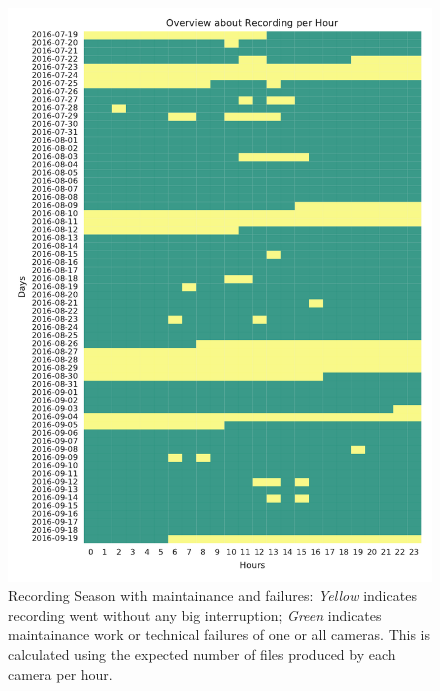 \begin{figure}[htb]
	\centering
	\includegraphics[width=1.0\textwidth]{Figures/recording}
	\caption[Recording Season with maintainance and failures]{Recording Season with maintainance and failures: \emph{Yellow} indicates recording went without any big interruption; \emph{Green} indicates maintainance work or technical failures of one or all cameras. This is calculated using the expected number of files produced by each camera per hour.}
	\label{fig:period}
\end{figure}

